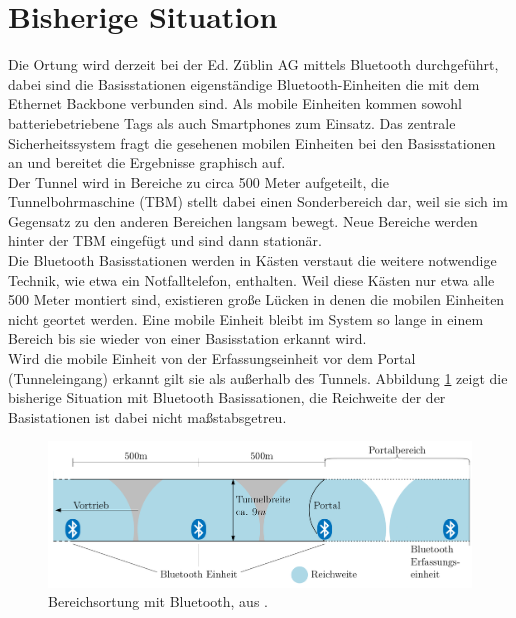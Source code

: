 \section{Bisherige Situation}
Die Ortung wird derzeit bei der Ed. Züblin AG mittels Bluetooth durchgeführt, dabei sind die Basisstationen eigenständige Bluetooth-Einheiten die mit dem Ethernet Backbone verbunden sind.
Als mobile Einheiten kommen sowohl batteriebetriebene Tags als auch Smartphones zum Einsatz. 
Das zentrale Sicherheitssystem fragt die gesehenen mobilen Einheiten bei den Basisstationen an und bereitet die Ergebnisse graphisch auf.\\
Der Tunnel wird in Bereiche zu circa 500 Meter aufgeteilt, die Tunnelbohrmaschine (TBM) stellt dabei einen Sonderbereich dar, weil sie sich im Gegensatz zu den anderen Bereichen langsam bewegt. 
Neue Bereiche werden hinter der TBM eingefügt und sind dann stationär.\\
Die Bluetooth Basisstationen werden in Kästen verstaut die weitere notwendige Technik, wie etwa ein Notfalltelefon, enthalten.
Weil diese Kästen nur etwa alle 500 Meter montiert sind, existieren große Lücken in denen die mobilen Einheiten nicht geortet werden.
Eine mobile Einheit bleibt im System so lange in einem Bereich bis sie wieder von einer Basisstation erkannt wird.\\
Wird die mobile Einheit von der Erfassungseinheit vor dem Portal (Tunneleingang) erkannt gilt sie als außerhalb des Tunnels.
Abbildung \ref{fig:bisherige} zeigt die bisherige Situation mit Bluetooth Basissationen, die Reichweite der der Basistationen ist dabei nicht maßstabsgetreu.

\begin{figure}[h]
  \centering
	\includegraphics[width=\textwidth]{images/bisherige.png}
  \caption{Bereichsortung mit Bluetooth, aus \cite{maurer2016unterstuetzung}.}
  \label{fig:bisherige}
\end{figure}

 
